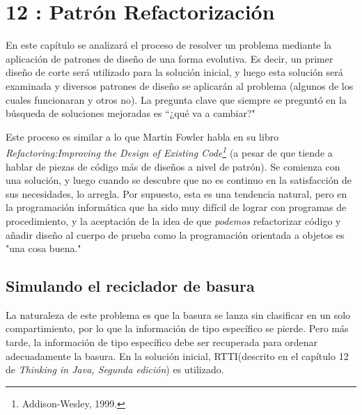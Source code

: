 \section*{12 : Patrón Refactorización}
\label{sec:pr}


En este capítulo se analizará el proceso de resolver un problema mediante la aplicación de patrones de diseño de una forma evolutiva. Es decir, un primer diseño de corte será utilizado para la solución inicial, y luego esta solución será examinada y diversos patrones de diseño se aplicarán al problema (algunos de los cuales funcionaran y otros no). La pregunta clave que siempre se preguntó en la búsqueda de soluciones mejoradas es “¿qué va a cambiar?"     \newline

Este proceso es similar a lo que Martin Fowler habla en su libro \textit{Refactoring:Improving the Design of Existing Code\footnote{Addison-Wesley, 1999.}} (a pesar de que tiende a hablar de piezas de código más de diseños a nivel de patrón). 
Se comienza con una solución, y luego cuando se descubre que no es continuo en la satisfacción de sus necesidades, lo arregla. 
Por supuesto, esta es una tendencia natural, pero en la programación informática que ha sido muy difícil de lograr con programas de procedimiento, y la aceptación de la idea de que \textit{podemos} refactorizar código y añadir diseño al cuerpo de prueba como la programación orientada a objetos es "una cosa buena." \newline



\subsection*{Simulando el reciclador de basura}
\label{subsec:serdb}

La naturaleza de este problema es que la basura se lanza sin clasificar en un solo compartimiento, por lo que la información de tipo específico se pierde. Pero más tarde, la información de tipo específico debe ser recuperada para ordenar adecuadamente la basura. En la solución inicial, RTTI(descrito en el capítulo 12 de \textit{Thinking in Java, Segunda edición}) es utilizado.    \newline

